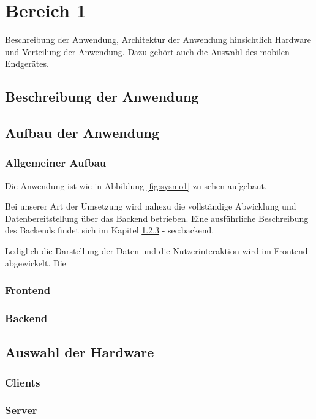 \section{Bereich 1}
Beschreibung der Anwendung, Architektur der Anwendung hinsichtlich Hardware und Verteilung der Anwendung.
Dazu gehört auch die Auswahl des mobilen Endgerätes.

\subsection{Beschreibung der Anwendung}


\subsection{Aufbau der Anwendung}
\subsubsection{Allgemeiner Aufbau}
Die Anwendung ist wie in Abbildung \ref{fig:sysmo1} zu sehen aufgebaut. 


Bei unserer Art der Umsetzung wird nahezu die vollständige 
Abwicklung und Datenbereitstellung über das Backend betrieben.
Eine ausführliche Beschreibung des Backends findet sich im Kapitel \ref{sec:backend} - \refname{sec:backend}.

Lediglich die Darstellung der Daten und die Nutzerinteraktion wird im Frontend abgewickelt.
Die 
\subsubsection{Frontend}
\label{sec:frontend}
\subsubsection{Backend}
\label{sec:backend}

\subsection{Auswahl der Hardware}
\subsubsection{Clients}
\subsubsection{Server}

